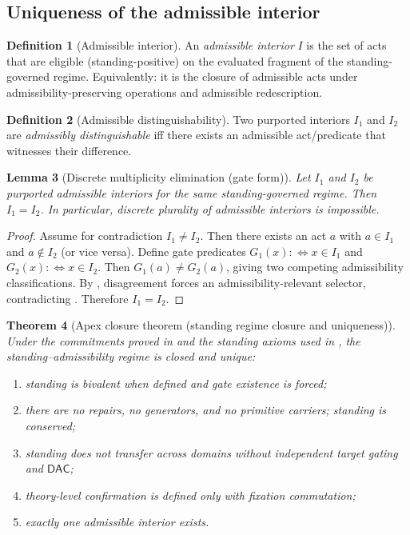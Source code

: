 \documentclass[11pt]{article}
\newtheorem{theorem}{Theorem}[section]
\newtheorem{lemma}[theorem]{Lemma}
\theoremstyle{definition}
\newtheorem{definition}[theorem]{Definition}
\newcommand{\DAC}{\mathsf{DAC}}
\begin{document}
\subsection{Uniqueness of the admissible interior}

\begin{definition}[Admissible interior]
An \emph{admissible interior} $I$ is the set of acts that are eligible (standing-positive) on the evaluated fragment of the standing-governed regime.
Equivalently: it is the closure of admissible acts under admissibility-preserving operations and admissible redescription.
\end{definition}

\begin{definition}[Admissible distinguishability]
Two purported interiors $I_1$ and $I_2$ are \emph{admissibly distinguishable} iff there exists an admissible act/predicate that witnesses their difference.
\end{definition}

\begin{lemma}[Discrete multiplicity elimination (gate form)]
\label{lem:no-multiple-interiors}
Let $I_1$ and $I_2$ be purported admissible interiors for the same standing-governed regime.
Then $I_1=I_2$.
In particular, discrete plurality of admissible interiors is impossible.
\end{lemma}

\begin{proof}
Assume for contradiction $I_1\neq I_2$.
Then there exists an act $a$ with $a\in I_1$ and $a\notin I_2$ (or vice versa).
Define gate predicates $G_1(x)\!:\Leftrightarrow x\in I_1$ and $G_2(x)\!:\Leftrightarrow x\in I_2$.
Then $G_1(a)\neq G_2(a)$, giving two competing admissibility classifications.
By , disagreement forces an admissibility-relevant selector, contradicting .
Therefore $I_1=I_2$.
\end{proof}

\begin{theorem}[Apex closure theorem (standing regime closure and uniqueness)]
\label{thm:apex}
Under the commitments proved in  and the standing axioms used in , the standing--admissibility regime is closed and unique:
\begin{enumerate}[label=(\roman*), leftmargin=2em]
\item standing is bivalent when defined and gate existence is forced;
\item there are no repairs, no generators, and no primitive carriers; standing is conserved;
\item standing does not transfer across domains without independent target gating and $\DAC$;
\item theory-level confirmation is defined only with fixation commutation;
\item exactly one admissible interior exists.
\end{enumerate}
\end{theorem}
\end{document}
